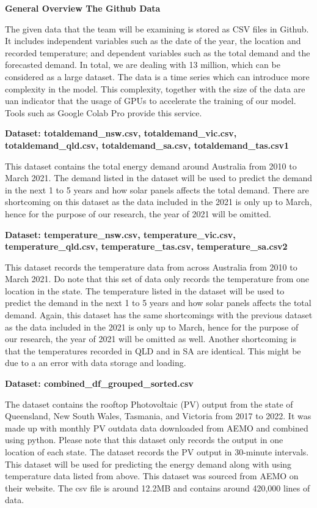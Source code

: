 \documentclass[
]{article}
\begin{document}
\textbf{General Overview The Github Data}

The given data that the team will be examining is stored as CSV files in
Github. It includes independent variables such as the date of the year,
the location and recorded temperature; and dependent variables such as
the total demand and the forecasted demand. In total, we are dealing
with 13 million, which can be considered as a large dataset. The data is
a time series which can introduce more complexity in the model. This
complexity, together with the size of the data are uan indicator that
the usage of GPUs to accelerate the training of our model. Tools such as
Google Colab Pro provide this service.

\textbf{Dataset: totaldemand\_nsw.csv, totaldemand\_vic.csv,
totaldemand\_qld.csv, totaldemand\_sa.csv, totaldemand\_tas.csv1}

This dataset contains the total energy demand around Australia from 2010
to March 2021. The demand listed in the dataset will be used to predict
the demand in the next 1 to 5 years and how solar panels affects the
total demand. There are shortcoming on this dataset as the data included
in the 2021 is only up to March, hence for the purpose of our research,
the year of 2021 will be omitted.

\textbf{Dataset: temperature\_nsw.csv, temperature\_vic.csv,
temperature\_qld.csv, temperature\_tas.csv, temperature\_sa.csv2}

This dataset records the temperature data from across Australia from
2010 to March 2021. Do note that this set of data only records the
temperature from one location in the state. The temperature listed in
the dataset will be used to predict the demand in the next 1 to 5 years
and how solar panels affects the total demand. Again, this dataset has
the same shortcomings with the previous dataset as the data included in
the 2021 is only up to March, hence for the purpose of our research, the
year of 2021 will be omitted as well. Another shortcoming is that the
temperatures recorded in QLD and in SA are identical. This might be due
to a an error with data storage and loading.

\textbf{Dataset: combined\_df\_grouped\_sorted.csv}

The dataset contains the rooftop Photovoltaic (PV) output from the state
of Queensland, New South Wales, Tasmania, and Victoria from 2017 to
2022. It was made up with monthly PV outdata data downloaded from AEMO
and combined using python. Please note that this dataset only records
the output in one location of each state. The dataset records the PV
output in 30-minute intervals. This dataset will be used for predicting
the energy demand along with using temperature data listed from above.
This dataset was sourced from AEMO on their website. The csv file is
around 12.2MB and contains around 420,000 lines of data.
\end{document}
